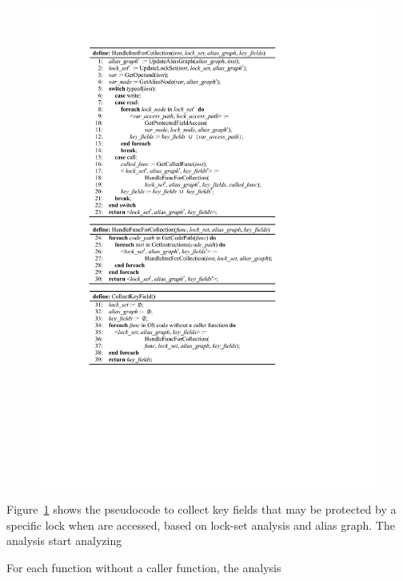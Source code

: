 \begin{figure}[htbp]
	\centering
	\includegraphics[width=1\linewidth]{figures/fig_pseudocode_field_extract.pdf}
	\label{fig_pseudocode_field_extract}
\end{figure}

Figure~\ref{fig_pseudocode_field_extract} shows the pseudocode to collect key 
fields that may be protected by a specific lock when are accessed, based on 
lock-set analysis and alias graph. The analysis start analyzing 

For each function without a caller function, the analysis 

